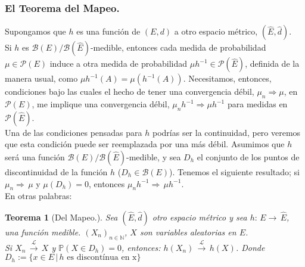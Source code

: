 \documentclass[a4paper]{article}
\newtheorem{teorema}{Teorema}
\numberwithin{equation}{subsection}
\def\N{\mathbb N}
\newcommand{\pb}{\mathbb{P}}
\begin{document}
\subsubsection{El Teorema del Mapeo.}
Supongamos que $h$ es una función de $(E,d)$ a otro espacio métrico, $(\hat{E},\hat{d})$. \\Si $h$ es $\mathcal{B}(E)/\mathcal{B}(\hat{E})$-medible, entonces cada medida de probabilidad $\mu \in \mathcal{P}(E)$ induce a otra medida de probabilidad $\mu h^{-1} \in \mathcal{P}(\hat{E})$, definida de la manera usual, como $\mu h^{-1}(A) = \mu(h^{-1}(A))$. \newpage Necesitamos, entonces, condiciones bajo las cuales el hecho de tener una convergencia débil, $\mu_n \Rightarrow \mu$, en $\mathcal{P}(E)$, me implique una convergencia débil, $\mu_nh^{-1} \Rightarrow \mu h^{-1}$ para medidas en $\mathcal{P}(\hat{E})$. \\ \newline
Una de las condiciones pensadas para $h$ podrías ser la continuidad, pero veremos que esta condición puede ser reemplazada por una más débil. Asumimos que $h$ será una función $\mathcal{B}(E)/\mathcal{B}(\hat{E})$-medible, y sea $D_h$ el conjunto de los puntos de discontinuidad de la función $h$ ($D_h \in \mathcal{B}(E)$). Tenemos el siguiente resultado;  si $\mu_n \Rightarrow\,\mu$ y $\mu(D_h) = 0$, entonces $\mu_n h^{-1} \Rightarrow\, \mu h^{-1}$. \\ \newline
En otras palabras:

\begin{teorema}[Del Mapeo.] Sea $(\hat{E},\hat{d})$ otro espacio métrico y sea $h:\,E\rightarrow\,\hat{E}$, una función medible. $(X_n)_{n\in\N}$, $X$ son variables aleatorias en $E$.\\ \newline
Si $X_n\,\xrightarrow{\mathcal{L}}\,X$ y $\pb(X \in D_h) = 0$, entonces: $h(X_n) \,\xrightarrow{\mathcal{L}}\,h(X)$. Donde $D_h :=\{x\in E\,|\,\text{$h$ es discontínua en x}\}$
\end{teorema}
\end{document}
